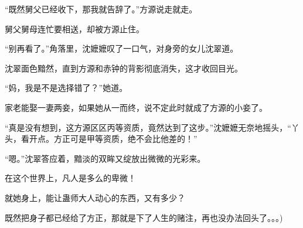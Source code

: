 \begin{this_body}
“既然舅父已经收下，那我就告辞了。”方源说走就走。

舅父舅母连忙要相送，却被方源止住。

“别再看了。”角落里，沈嬷嬷叹了一口气，对身旁的女儿沈翠道。

沈翠面色黯然，直到方源和赤钟的背影彻底消失，这才收回目光。

“妈，我是不是选择错了？”她道。

家老能娶一妻两妾，如果她从一而终，说不定此时就成了方源的小妾了。

“真是没有想到，这方源区区丙等资质，竟然达到了这步。”沈嬷嬷无奈地摇头，“丫头，看开点。方正可是甲等资质，绝不会比他差的！”

“嗯。”沈翠答应着，黯淡的双眸又绽放出微微的光彩来。

在这个世界上，凡人是多么的卑微！

就她身上，能让蛊师大人动心的东西，又有多少？

既然把身子都已经给了方正，那就是下了人生的赌注，再也没办法回头了。。。)

\end{this_body}

